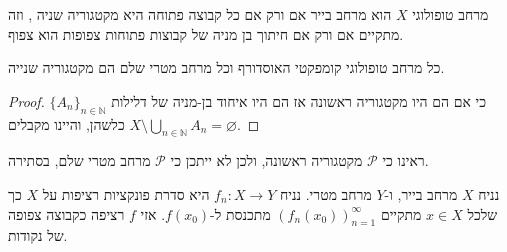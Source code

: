\documentclass{tstextbook}
\begin{document}
\begin{proposition}
מרחב טופולוגי \(X\) הוא מרחב בייר אם ורק אם כל קבוצה פתוחה היא מקטגוריה שניה , וזה מתקיים אם ורק אם חיתוך בן מניה של קבוצות פתוחות צפופות הוא צפוף.

\end{proposition}
\begin{corollary}
כל מרחב טופולוגי קומפקטי האוסדורף וכל מרחב מטרי שלם הם מקטגוריה שנייה.

\end{corollary}
\begin{proof}
כי אם הם היו מקטגוריה ראשונה אז הם היו איחוד בן-מניה של דלילות \(\{A_{n}\}_{n\in\mathbb{N}}\) כלשהן, והיינו מקבלים \(X\setminus\bigcup_{n\in\mathbb{N}}A_{n}=\varnothing\).

\end{proof}
\begin{example}
ראינו כי \(\mathcal{P}\) מקטגוריה ראשונה, ולכן לא ייתכן כי \(\mathcal{P}\) מרחב מטרי שלם, בסתירה.

\end{example}
\begin{example}
נניח \(X\) מרחב בייר, ו-\(Y\) מרחב מטרי. נניח \(f_{n}:X\to Y\) היא סדרת פונקציות רציפות על \(X\) כך שלכל \(x \in X\) מתקיים \((f_{n}(x_{0}))_{n=1}^{\infty}\) מתכנסת ל-\(f(x_{0})\). אזי \(f\) רציפה כקבוצה צפופה של נקודות.

\end{example}
\end{document}
